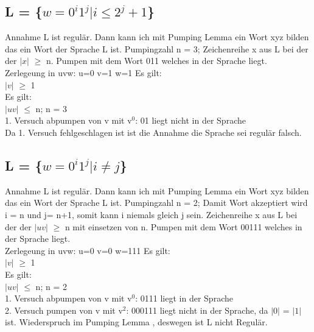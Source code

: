 \documentclass[11pt]{article} %
\begin{document}
 \subsection{L = \{$w = 0^{i}1^{j}| i \leq 2^{j}+1$\}} 
 Annahme L ist regulär.
 Dann kann ich mit Pumping Lemma ein Wort xyz bilden das ein Wort der Sprache L ist. 
 Pumpingzahl n = 3;
 Zeichenreihe x aus L bei der der $\vert x\vert$ $\geq$ n.
 Pumpen mit dem Wort 011 welches in der Sprache liegt.\\
 Zerlegeung in uvw:  u=0 v=1 w=1
Es gilt: \\ $\vert v\vert$ $\geq$ 1\\
Es gilt: \\  $\vert uv\vert$ $\leq$ n; n = 3\\
 1. Versuch abpumpen von v mit v$^{0}$:
 01 liegt nicht in der Sprache \\
 Da 1. Versuch fehlgeschlagen ist ist die Annahme die Sprache sei regulär falsch.
   
 \subsection{L = \{$w = 0^{i}1^{j}| i \neq j$\}}
 
 Annahme L ist regulär.
 Dann kann ich mit Pumping Lemma ein Wort xyz bilden das ein Wort der Sprache L ist. 
 Pumpingzahl n = 2;
 Damit Wort akzeptiert wird i = n und j= n+1, somit kann i niemals gleich j sein.
 Zeichenreihe x aus L bei der der  $\vert uv\vert$ $\geq$ n mit einsetzen von n.
 Pumpen mit dem Wort 00111 welches in der Sprache liegt.\\
 Zerlegeung in uvw:  u=0 v=0 w=111
Es gilt: \\  $\vert v\vert$ $\geq$ 1\\
Es gilt: \\  $\vert uv\vert$ $\leq$ n; n = 2\\
1. Versuch abpumpen von v mit v$^{0}$:
0111 liegt in der Sprache \\
2. Versuch pumpen von v mit v$^{2}$:
000111 liegt nicht in der Sprache, da  $\vert 0\vert$ =  $\vert 1\vert$ ist. Wiederspruch im Pumping Lemma , deswegen ist L nicht Regulär.\\
\end{document}
